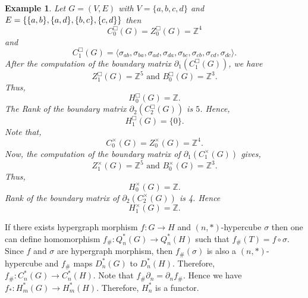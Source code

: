 \documentclass[10pt,a4paper]{amsart}
\newtheorem{ex}[subsection]{Example}
\newtheorem{prop}[subsection]{Proposition}
\begin{document}
\begin{ex}\label{eg box and x 1-hom}
Let $G=(V,E)$ with $V=\{a,b,c,d\}$ and $E=\{\{a,b\}, \{a,d\},\\ \{b,c\}, \{c,d\}\}$ then \[{C}_0^\Box(G)={Z}_0^\Box(G)=\mathbb{Z}^4\] and \[{C}_1^\Box(G)=\langle \sigma_{ab}, \sigma_{ba},\sigma_{ad},\sigma_{da},\sigma_{bc},\sigma_{cb}, \sigma_{cd},\sigma_{dc}\rangle.\] After the computation of the boundary matrix $\partial_{1}({C}_1^\Box(G))$, we have \[{Z}_1^\Box(G)=\mathbb{Z}^5 \text{ and } {B}_0^\Box(G)=\mathbb{Z}^3.\] Thus, \[H_0^\Box(G)= \mathbb{Z}.\] The Rank of the boundary matrix $\partial_{2}({C}_2^\Box(G))$ is $5$. Hence, \[H_1^\Box(G)=\{0\}.\] Note that, \[{C}_0^\times(G)={Z}_0^\times(G)=\mathbb{Z}^4.\] Now, the computation of the boundary matrix of $\partial_1({C}_1^\times(G))$ gives, \[{Z}_1^\times(G)=\mathbb{Z}^5 \text{ and } {B}_0^\times(G)=\mathbb{Z}^3.\] Thus, \[H_0^\times(G)=\mathbb{Z}.\] Rank of the boundary matrix of $\partial_{2}({C}_2^\times(G))$ is 4. Hence \[H_1^\times(G)=\mathbb{Z}.\]
\end{ex}


If there exists hypergraph morphism $f:G\rightarrow H$ and  $(n,*)$-hypercube $\sigma$ then one can define homomorphism $f_{\#}: Q_n^*(G)\rightarrow  Q_n^*(H)$ such that $f_{\#}(T)=f\circ \sigma$. Since $f$ and $\sigma$ are hypergraph morphism, then $f_{\#}(\sigma)$ is also a $(n,*)$-hypercube and $f_{\#}$ maps $ D_n^*(G)$ to $ D_n^*(H)$. Therefore, $f_{\#}: C_n^*(G)\rightarrow  C_n^*(H)$.
Note that $f_{\#} \partial_n=\partial_{n}f_{\#}$. Hence we have $f_{*}: H_m^*(G) \rightarrow  H_m^*(H)$. Therefore, $H_n^*$ is a functor.



			
\end{document}
